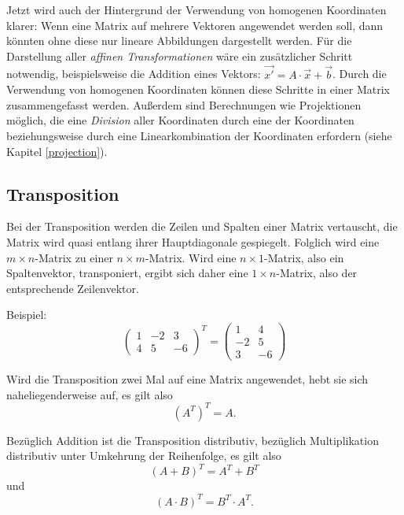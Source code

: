 \label{homogenousmultiplication}
Jetzt wird auch der Hintergrund der Verwendung von homogenen Koordinaten klarer: Wenn eine Matrix auf mehrere Vektoren angewendet werden soll, dann könnten ohne diese nur lineare Abbildungen dargestellt werden. Für die Darstellung aller \emph{affinen Transformationen} wäre ein zusätzlicher Schritt notwendig, beispielsweise die Addition eines Vektors: $\vec{x'} = A \cdot \vec{x} + \vec{b}$. Durch die Verwendung von homogenen Koordinaten können diese Schritte in einer Matrix zusammengefasst werden. Außerdem sind Berechnungen wie Projektionen möglich, die eine \emph{Division} aller Koordinaten durch eine der Koordinaten beziehungsweise durch eine Linearkombination der Koordinaten erfordern (siehe Kapitel \ref{projection}).


\subsection{Transposition}
\label{transposition}
Bei der Transposition werden die Zeilen und Spalten einer Matrix vertauscht, die Matrix wird quasi entlang ihrer Hauptdiagonale gespiegelt. Folglich wird eine $m \times n$-Matrix zu einer $n \times m$-Matrix. Wird eine $n \times 1$-Matrix, also ein Spaltenvektor, transponiert, ergibt sich daher eine $1 \times n$-Matrix, also der entsprechende Zeilenvektor.

Beispiel:
\begin{equation}
  \begin{pmatrix}
    1 & -2 & 3 \\
    4 & 5 & -6
  \end{pmatrix}^T
  =
  \begin{pmatrix}
    1 & 4 \\
    -2 & 5 \\
    3 & -6
  \end{pmatrix}
\end{equation}

Wird die Transposition zwei Mal auf eine Matrix angewendet, hebt sie sich naheliegenderweise auf, es gilt also
\begin{equation}
 (A^T)^T = A.
\end{equation}

Bezüglich Addition ist die Transposition distributiv, bezüglich Multiplikation distributiv unter Umkehrung der Reihenfolge, es gilt also
\begin{equation}
 (A + B)^T = A^T + B^T
\end{equation}
und
\begin{equation}
\label{transpositionmultiplication}
 (A \cdot B)^T = B^T \cdot A^T.
\end{equation}

